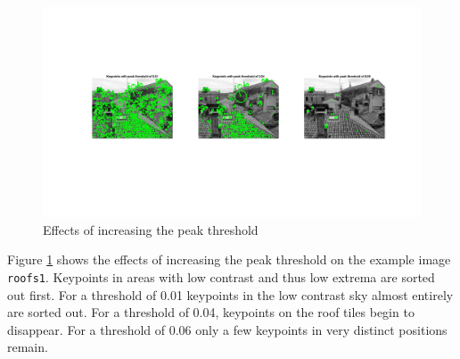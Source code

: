 \begin{figure}[!hbt]
  \includegraphics[width=\textwidth]{img/inc_peak_thresh}
  \caption{Effects of increasing the peak threshold}
  \label{fig:inc_peak_thresh}
\end{figure}

Figure \ref{fig:inc_peak_thresh} shows the effects of increasing the peak threshold on the example image \texttt{roofs1}. Keypoints in areas with low contrast and thus low extrema are sorted out first. For a threshold of 0.01 keypoints in the low contrast sky almost entirely are sorted out. For a threshold of 0.04, keypoints on the roof tiles begin to disappear. For a threshold of 0.06 only a few keypoints in very distinct positions remain.

\newpage